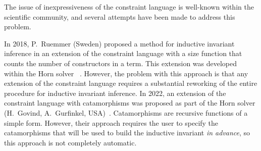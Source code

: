 {\progress} The issue of inexpressiveness of the constraint language is well-known within the scientific community, and several attempts have been made to address this problem.


In 2018, P.~Ruemmer (Sweden) proposed a method for inductive invariant inference in an extension of the constraint language with a size function that counts the number of constructors in a term. This extension was developed within the Horn solver \eldarica{}~\cite{8603013}. However, the problem with this approach is that any extension of the constraint language requires a substantial reworking of the entire procedure for inductive invariant inference.
In 2022, an extension of the constraint language with catamorphisms was proposed as part of the \racer{} Horn solver (H.~Govind, A.~Gurfinkel, USA)~\cite{10.1145/3498722}. Catamorphisms are recursive functions of a simple form. However, their approach requires the user to specify the catamorphisms that will be used to build the inductive invariant \emph{in advance}, so this approach is not completely automatic.

